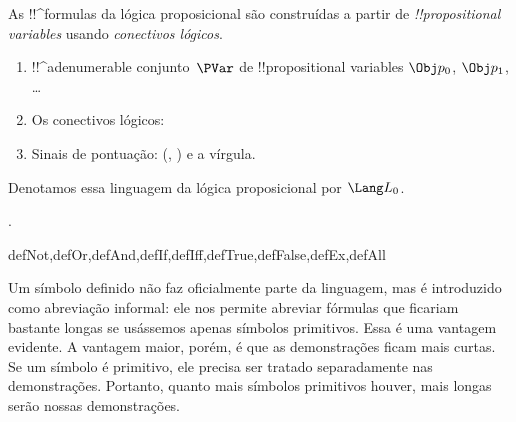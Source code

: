\documentclass[../../../include/open-logic-section]{subfiles}
\begin{document}


As !!^{formula}s da lógica proposicional são construídas a partir de
\emph{!!{propositional
    variable}s} usando \emph{conectivos
  lógicos}.

\begin{enumerate}
\item !!^a{denumerable} conjunto~$\PVar$ de !!{propositional variable}s $\Obj p_0$,
  $\Obj p_1$, \dots
{}
\item Os conectivos lógicos:
  \startycommalist
\item Sinais de pontuação: (, ) e a vírgula.
\end{enumerate}

Denotamos essa linguagem da lógica proposicional por $\Lang L_0$.

.

\begin{tagblock}{defNot,defOr,defAnd,defIf,defIff,defTrue,defFalse,defEx,defAll}
\begin{explain}
Um símbolo definido não faz oficialmente parte da linguagem, mas é
introduzido como abreviação informal: ele nos permite abreviar
fórmulas que ficariam bastante longas se usássemos apenas símbolos
primitivos. Essa é uma vantagem evidente. A vantagem maior, porém, é
que as demonstrações ficam mais curtas. Se um símbolo é primitivo, ele
precisa ser tratado separadamente nas demonstrações. Portanto, quanto
mais símbolos primitivos houver, mais longas serão nossas
demonstrações.
\end{explain}
\end{tagblock}
\end{document}
